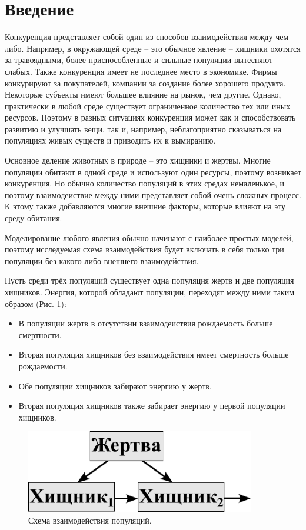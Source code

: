 \section{Введение}
    Конкуренция представляет собой один из способов взаимодействия между чем-либо. Например, в окружающей среде -- это обычное явление -- хищники охотятся за травоядными, более приспособленные и сильные популяции вытесняют слабых. Также конкуренция имеет не последнее место в экономике. Фирмы конкурируют за покупателей, компании за создание более хорошего продукта. Некоторые субъекты имеют большее влияние на рынок, чем другие. Однако, практически в любой среде существует ограниченное количество тех или иных ресурсов. Поэтому в разных ситуациях конкуренция может как и способствовать развитию и улучшать вещи, так и, например, неблагоприятно сказываться на популяциях живых существ и приводить их к вымиранию.

    Основное деление животных в природе -- это хищники и жертвы. Многие популяции обитают в одной среде и используют один ресурсы, поэтому возникает конкуренция. Но обычно количество популяций в этих средах немаленькое, и поэтому взаимодеиствие между ними представляет собой очень сложных процесс. К этому также добавляются многие внешние факторы, которые влияют на эту среду обитания.

    Моделирование любого явления обычно начинают с наиболее простых моделей, поэтому исследуемая схема взаимодействия будет включать в себя только три популяции без какого-либо внешнего взаимодействия.

    Пусть среди трёх популяций существует одна популяция жертв и две популяция хищников. Энергия, которой обладают популяции, переходят между ними таким образом (Рис. \ref{scheme}):
    
    \begin{itemize}
        \item В популяции жертв в отсутствии взаимодеиствия рождаемость больше смертности.
        \item Вторая популяция хищников без взаимодействия имеет смертность больше рождаемости.
        \item Обе популяции хищников забирают энергию у жертв.
        \item Вторая популяция хищников также забирает энергию у первой популяции хищников.
    \end{itemize}

    \begin{figure}[H]
        \centering
        \includegraphics[width=10cm]{pictures/scheme.pdf}
        \caption{Схема взаимодействия популяций.}\label{scheme}
    \end{figure}

